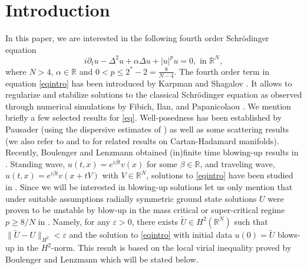 \documentclass[a4paper,two-side,10pt]{amsart}
\newcommand{\R}{\mathbb{R}}
\numberwithin{equation}{section}
\begin{document}
\section{Introduction}
In this paper, we are interested in the following fourth order Schr\"odinger equation
\begin{equation}
\label{eqintro}
i\partial_t u -\Delta^2 u +\alpha \Delta u + |u|^{p} u=0,\text{ in } \R^N,
\end{equation}
where $N>4$, $\alpha \in \R$ and $0<p \leq 2^\ast -2 = \frac{8}{N-4}$.
The fourth order term in equation \eqref{eqintro} has been introduced by Karpman and
Shagalov \cite{MR1779828}. It allows to regularize and stabilize solutions to the classical
Schr\"odinger equation as observed through numerical simulations by Fibich, Ilan,
and Papanicolaou \cite{MR1898529}. We mention briefly a few selected results for \eqref{eq}.
Well-posedness has been established by Pausader \cite{MR2505703,MR2502523} (using the dispersive estimates of
\cite{MR1745182}) as well as some scattering results (we also refer to \cite{MR3462127} and to \cite{CH} for related results on Cartan-Hadamard manifolds). Recently, Boulenger and Lenzmann obtained (in)finite time blowing-up results in \cite{bou-lenz}. Standing wave, $u(t,x)=e^{i\beta t} v(x)$ for some $\beta \in \R$, and traveling wave, $u(t,x)=e^{i \beta t } v(x+t V)$ with $V\in \R^N$, solutions to \eqref{eqintro} have been studied in \cite{MR3855391,MR3976588,MR3977892,CF}.  Since we will be interested in blowing-up solutions let us only mention that under suitable assumptions radially symmetric ground state solutions $U$ were proven to be unstable by blow-up in the mass critical or super-critical regime $p\geq 8/N$ in \cite{MR4001029}. Namely, for any $\varepsilon>0$, there exists $\tilde{U} \in H^2 (\R^N)$ such that $\|\tilde{U} -U\|_{H^2}<\varepsilon$ and the solution to \eqref{eqintro} with initial data $u(0)=\tilde{U}$ blows-up in the $H^2$-norm. This result is based on the local virial inequality proved by Boulenger and Lenzmann which will be stated below.
\end{document}
